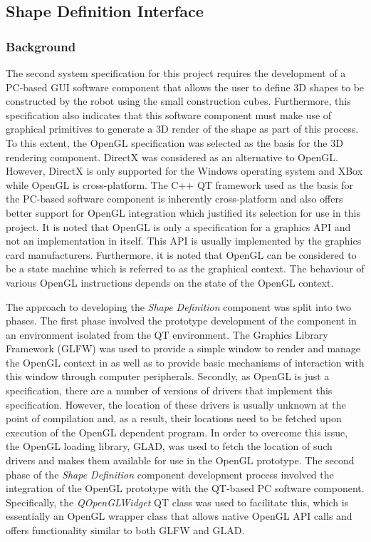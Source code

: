 \subsection{Shape Definition Interface}

\subsubsection{Background}

The second system specification for this project requires the development of a PC-based GUI software component that allows the user to define 3D shapes to be constructed by the robot using the small construction cubes. Furthermore, this specification also indicates that this software component must make use of graphical primitives to generate a 3D render of the shape as part of this process. To this extent, the OpenGL specification was selected as the basis for the 3D rendering component. DirectX was considered as an alternative to OpenGL. However, DirectX is only supported for the Windows operating system and XBox while OpenGL is cross-platform. The C++ QT framework used as the basis for the PC-based software component is inherently cross-platform and also offers better support for OpenGL integration which justified its selection for use in this project. It is noted that OpenGL is only a specification for a graphics API and not an implementation in itself. This API is usually implemented by the graphics card manufacturers. Furthermore, it is noted that OpenGL can be considered to be a state machine which is referred to as the graphical context. The behaviour of various OpenGL instructions depends on the state of the OpenGL context.

The approach to developing the \textit{Shape Definition} component was split into two phases. The first phase involved the prototype development of the component in an environment isolated from the QT environment. The Graphics Library Framework (GLFW) was used to provide a simple window to render and manage the OpenGL context in as well as to provide basic mechanisms of interaction with this window through computer peripherals. Secondly, as OpenGL is just a specification, there are a number of versions of drivers that implement this specification. However, the location of these drivers is usually unknown at the point of compilation and, as a result, their locations need to be fetched upon execution of the OpenGL dependent program. In order to overcome this issue, the OpenGL loading library, GLAD, was used to fetch the location of such drivers and makes them available for use in the OpenGL prototype. The second phase of the \textit{Shape Definition} component development process involved the integration of the OpenGL prototype with the QT-based PC software component. Specifically, the \textit{QOpenGLWidget} QT class was used to facilitate this, which is essentially an OpenGL wrapper class that allows native OpenGL API calls and offers functionality similar to both GLFW and GLAD.


